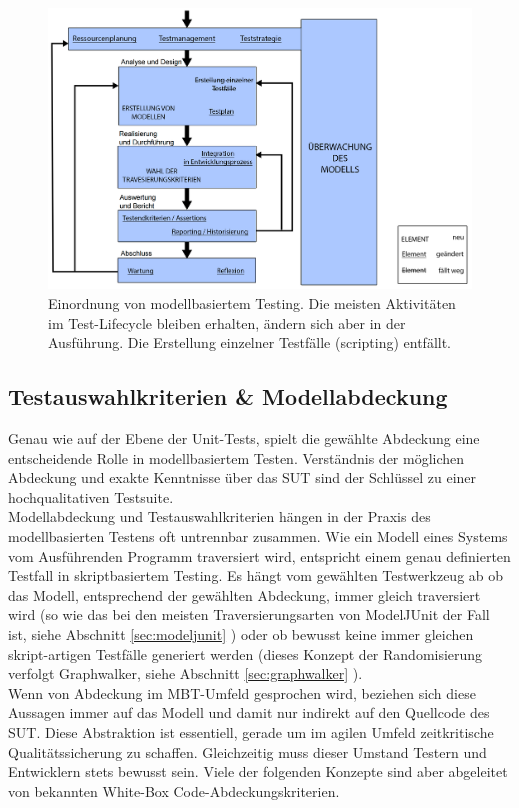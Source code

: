 \begin{figure}[h] 
  \centering
     \includegraphics[width=1.1\textwidth]{figures/mbt_vergleich_skript.png}
  \caption{Einordnung von modellbasiertem Testing. Die meisten Aktivitäten im Test-Lifecycle bleiben erhalten, ändern sich aber in der Ausführung. Die Erstellung einzelner Testfälle (scripting) entfällt.}
  \label{fig:script_vs_mbt}
\end{figure}

\subsection{Testauswahlkriterien \& Modellabdeckung}
\label{sec:coverage}

Genau wie auf der Ebene der Unit-Tests, spielt die gewählte Abdeckung eine entscheidende Rolle in modellbasiertem Testen. Verständnis der möglichen Abdeckung und exakte Kenntnisse über das \Gls{SUT} sind der Schlüssel zu einer hochqualitativen Testsuite.\\
Modellabdeckung und Testauswahlkriterien hängen in der Praxis des modellbasierten Testens oft untrennbar zusammen. Wie ein Modell eines Systems vom Ausführenden Programm traversiert wird, entspricht einem genau definierten Testfall in skriptbasiertem Testing. Es hängt vom gewählten Testwerkzeug ab ob das Modell, entsprechend der gewählten Abdeckung, immer gleich traversiert wird (so wie das bei den meisten Traversierungsarten von ModelJUnit der Fall ist, siehe Abschnitt \ref{sec:modeljunit} ) oder ob bewusst keine immer gleichen skript-artigen Testfälle generiert werden (dieses Konzept der Randomisierung verfolgt Graphwalker, siehe Abschnitt \ref{sec:graphwalker} ).\\
Wenn von Abdeckung im MBT-Umfeld gesprochen wird, beziehen sich diese Aussagen immer auf das Modell und damit nur indirekt auf den Quellcode des SUT. Diese Abstraktion ist essentiell, gerade um im agilen Umfeld zeitkritische Qualitätssicherung zu schaffen.\cite{utting_practical_2007} Gleichzeitig muss dieser Umstand Testern und Entwicklern stets bewusst sein. Viele der folgenden Konzepte sind aber abgeleitet von bekannten White-Box Code-Abdeckungskriterien.

